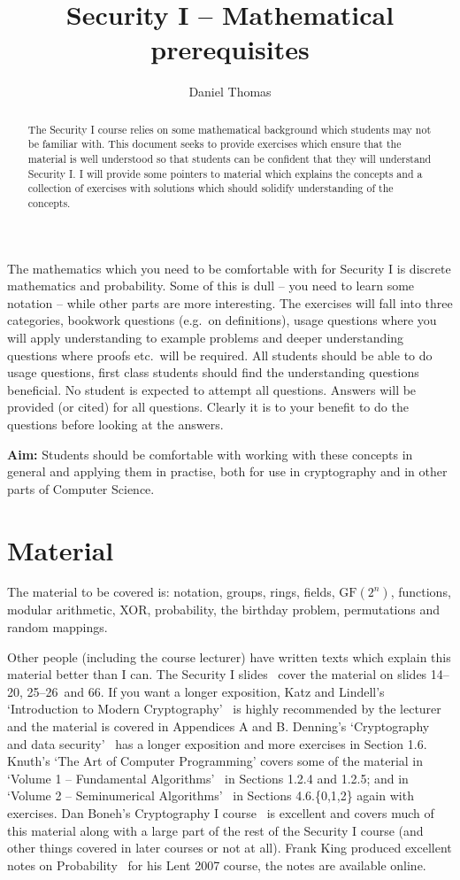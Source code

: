 \documentclass[11pt,a4paper]{article}
\author{Daniel Thomas}
\title{Security I -- Mathematical prerequisites}
\newcommand{\slidesinitialmath}{14--20}
\newcommand{\slidesprobability}{25--26}
\newcommand{\slidesbirthday}{66}
\newcommand{\slidesall}{\slidesinitialmath, \slidesprobability\ and \slidesbirthday}
\begin{document}
\maketitle

\begin{abstract}
The Security I course relies on some mathematical background which students may not be familiar with.
This document seeks to provide exercises which ensure that the material is well understood so that students can be confident that they will understand Security I.
I will provide some pointers to material which explains the concepts and a collection of exercises with solutions which should solidify understanding of the concepts.
\end{abstract}

The mathematics which you need to be comfortable with for Security I is discrete mathematics and probability.
Some of this is dull -- you need to learn some notation -- while other parts are more interesting.
The exercises will fall into three categories, bookwork questions (e.g.\ on definitions), usage questions where you will apply understanding to example problems and deeper understanding questions where proofs etc.\ will be required.
All students should be able to do usage questions, first class students should find the understanding questions beneficial.
No student is expected to attempt all questions.
Answers will be provided (or cited) for all questions.
Clearly it is to your benefit to do the questions before looking at the answers.

{\bf Aim:} Students should be comfortable with working with these concepts in general and applying them in practise, both for use in cryptography and in other parts of Computer Science.

\section*{Material}
The material to be covered is: notation, groups, rings, fields, $\mathrm{GF}(2^n)$, functions, modular arithmetic, XOR, probability, the birthday problem, permutations and random mappings.

Other people (including the course lecturer) have written texts which explain this material better than I can.
The Security I slides~\cite{SecurityISlides} cover the material on slides \slidesall.
If you want a longer exposition, Katz and Lindell's `Introduction to Modern Cryptography'~\cite{Katz2008} is highly recommended by the lecturer and the material is covered in Appendices A and B.
Denning's `Cryptography and data security'~\cite{Denning1982} has a longer exposition and more exercises in Section 1.6.
Knuth's `The Art of Computer Programming' covers some of the material in `Volume 1 -- Fundamental Algorithms'~\cite{KnuthTAOCP1} in Sections 1.2.4 and 1.2.5; and in `Volume 2 -- Seminumerical Algorithms'~\cite{KnuthTAOCP2} in Sections 4.6.\{0,1,2\} again with exercises.
Dan Boneh's Cryptography I course~\cite{CryptoI} is excellent and covers much of this material along with a large part of the rest of the Security I course (and other things covered in later courses or not at all).
Frank King produced excellent notes on Probability~\cite{King2007} for his Lent 2007 course, the notes are available online.
\end{document}
